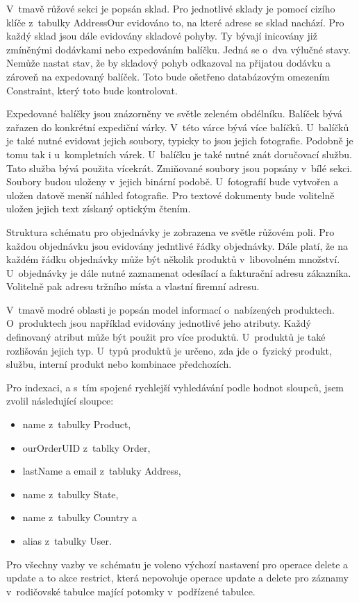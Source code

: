 \documentclass[thesis=B,czech]{FITthesis}[2012/06/26]
\begin{document}
	V~tmavě růžové sekci je popsán sklad. Pro jednotlivé sklady je pomocí cizího klíče z~tabulky AddressOur evidováno to, na které adrese se sklad nachází. Pro každý sklad jsou dále evidovány skladové pohyby. Ty bývají inicovány již zmíněnými dodávkami nebo expedováním balíčku. Jedná se o~dva výlučné stavy. Nemůže nastat stav, že by skladový pohyb odkazoval na přijatou dodávku a zároveň na expedovaný balíček. Toto bude ošetřeno databázovým omezením Constraint, který toto bude kontrolovat.
	
	Expedované balíčky jsou znázorněny ve světle zeleném obdélníku. Balíček bývá zařazen do konkrétní expediční várky. V~této várce bývá více balíčků. U~balíčků je také nutné evidovat jejich soubory, typicky to jsou jejich fotografie. Podobně je tomu tak i u~kompletních várek. U~balíčku je také nutné znát doručovací službu. Tato služba bývá použita vícekrát. Zmiňované soubory jsou popsány v~bílé sekci. Soubory budou uloženy v~jejich binární podobě. U~fotografií bude vytvořen a uložen datově menší náhled fotografie. Pro textové dokumenty bude volitelně uložen jejich text získaný optickým čtením.

	Struktura schématu pro objednávky je zobrazena ve světle růžovém poli. Pro každou objednávku jsou evidovány jedntlivé řádky objednávky. Dále platí, že na každém řádku objednávky může být několik produktů v~libovolném množství. U~objednávky je dále nutné zaznamenat odesílací a fakturační adresu zákazníka. Volitelně pak adresu tržního místa a vlastní firemní adresu.
	
	V~tmavě modré oblasti je popsán model informací o~nabízených produktech. O~produktech jsou například evidovány jednotlivé jeho atributy. Každý definovaný atribut může být použit pro více produktů. U~produktů je také rozlišován jejich typ. U~typů produktů je určeno, zda jde o~fyzický produkt, službu, interní produkt nebo kombinace předchozích.
	
	Pro indexaci, a s~tím spojené rychlejší vyhledávání podle hodnot sloupců, jsem zvolil následující sloupce: 
	\begin{itemize}
		\item name z~tabulky Product,
		\item ourOrderUID z~tablky Order,
		\item lastName a email z~tabluky Address,
		\item name z~tabulky State,
		\item name z~tabulky Country a
		\item alias z~tabulky User.
	\end{itemize}
	Pro všechny vazby ve schématu je voleno výchozí nastavení pro operace delete a update a to akce restrict, která nepovoluje operace update a delete pro záznamy v~rodičovské tabulce mající potomky v~podřízené tabulce.
	
\end{document}
